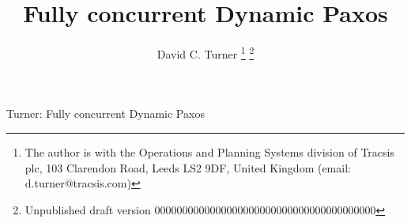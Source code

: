 \documentclass[journal]{IEEEtran}
\begin{document}
%
\title{Fully concurrent Dynamic Paxos}
%
%
%

\author{David C. Turner%
\thanks{The author is with the Operations and Planning Systems division of
Tracsis plc, 103 Clarendon Road, Leeds LS2 9DF, United Kingdom (email:
d.turner@tracsis.com)
}%
\thanks{Unpublished draft version
0000000000000000000000000000000000000000
}%
}

% 
%



\markboth{}%
{Turner: Fully concurrent Dynamic Paxos}
% 
\end{document}

